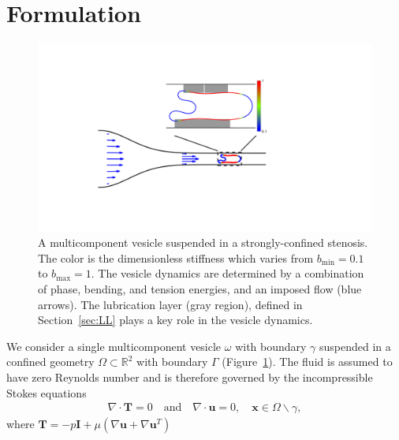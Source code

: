 \documentclass[twoside,twocolumn,9pt]{article}
\newcommand{\RR}{\mathbb{R}}
\newcommand{\uu}{\mathbf{u}}
\newcommand{\TT}{\mathbf{T}}
\newcommand{\xx}{\mathbf{x}}
\begin{document}
\section{\label{sec:Formulation}Formulation}
\begin{figure}[H]
  \centering
  \includegraphics[width=0.9\columnwidth]{figures/schematic.pdf}
  \caption{\label{fig:schematic}\small A multicomponent vesicle
  suspended in a strongly-confined stenosis. The color is the
  dimensionless stiffness which varies from $b_{\min} = 0.1$ to
  $b_{\max} = 1$. The vesicle dynamics are determined by a combination
  of phase, bending, and tension energies, and an imposed flow (blue
  arrows). The lubrication layer (gray region), defined in
  Section~\ref{sec:LL} plays a key role in the vesicle dynamics.}
\end{figure}
We consider a single multicomponent vesicle $\omega$ with boundary
$\gamma$ suspended in a confined geometry $\Omega \subset \RR ^2$ with
boundary $\Gamma$ (Figure~\ref{fig:schematic}). The fluid is assumed to
have zero Reynolds number and is therefore governed by the
incompressible Stokes equations
\begin{align}
  \nabla \cdot \TT = 0 \quad \text{and} \quad \nabla \cdot \uu = 0, 
    \quad \xx \in \Omega \backslash \gamma,
\end{align}
where $\TT = -p\mathbf{I} + \mu\left(\nabla \uu + \nabla \uu^T \right)$
\end{document}
